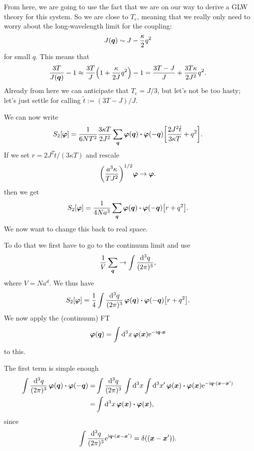 \documentclass[11pt,letter, swedish, english
]{article}
\newcommand{\Tc}{\ensuremath{T_{\text{c}}}}
\begin{document}
From here, we are going to use the fact that we are on our way to
derive a GLW theory for this system. So we are close to $\Tc$,
meaning that we really only need to worry about the long-wavelength
limit for the coupling:
\begin{equation}
J(\vb*q)\sim J-\frac{\kappa}{2}q^2
\end{equation}
for small $q$. This means that
\begin{equation}
\frac{3T}{J(\vb*q)}-1\approx
\frac{3T}{J}\qty(1+\frac{\kappa}{2J}q^2)-1
=\frac{3T-J}{J}+\frac{3T\kappa}{2J^2}q^2.
\end{equation}
Already from here we can anticipate that $\Tc=J/3$, but let's not be
too hasty; let's just settle for calling $\tilde{t}:=(3T-J)/J$. 

We can now write
\begin{equation}
S_2[\vb*\varphi]=\frac{1}{6NT^2}\frac{3\kappa T}{2J^2}\sum_{\vb*q}
\vb*\varphi(\vb*q)\vdot\vb*\varphi(-\vb*q)
\qty[\frac{2J^2\tilde{t}}{3\kappa T}+q^2].
\end{equation}
If we set $r=2J^2\tilde{t}/(3\kappa T)$ and rescale
\begin{equation}\label{eq:3_rescale}
\qty(\frac{a^3\kappa}{TJ^2})^{1/2}\vb*\varphi\to\vb*\varphi.
\end{equation}
then we get
\begin{equation}
S_2[\vb*\varphi]=\frac{1}{4Na^3}\sum_{\vb*q}
\vb*\varphi(\vb*q)\vdot\vb*\varphi(-\vb*q)
\qty[r+q^2].
\end{equation}
We now want to change this back to real space.

To do that we first have to go to the continuum limit and use 
\begin{equation}
\frac{1}{V}\sum_{\vb*q} \to \int\frac{\rd^3q}{(2\pi)^3},
\end{equation}
where $V=Na^d$. We thus have
\begin{equation}\label{eq:3_S2_qint}
S_2[\vb*\varphi]=\frac{1}{4}\int\frac{\rd^3q}{(2\pi)^3}\,
\vb*\varphi(\vb*q)\vdot\vb*\varphi(-\vb*q)
\qty[r+q^2].
\end{equation}
We now apply the (continuum) FT
\begin{equation}
\vb*\varphi(\vb*q)=\int\rd^3x\,
\vb*\varphi(\vb*x)\ee^{-\ii\vb*q\vdot\vb*x}
\end{equation}
to this.

The first term is simple enough
\begin{equation}
\begin{aligned}
\int\frac{\rd^3q}{(2\pi)^3}\,
\vb*\varphi(\vb*q)\vdot\vb*\varphi(-\vb*q)
=&\int\frac{\rd^3q}{(2\pi)^3}\,
\int\rd^3x\int\rd^3x'\,
\vb*\varphi(\vb*x)\vdot\vb*\varphi(\vb*x)
\ee^{-\ii\vb*q\vdot(\vb*x-\vb*x')}\\
=&\int\rd^3x\,\vb*\varphi(\vb*x)\vdot\vb*\varphi(\vb*x),
\end{aligned}
\end{equation}
since
\begin{equation}
\int\frac{\rd^3q}{(2\pi)^3}\ee^{\ii\vb*q\vdot(\vb*x-\vb*x')}
=\delta((\vb*x-\vb*x')).
\end{equation}
\end{document}
